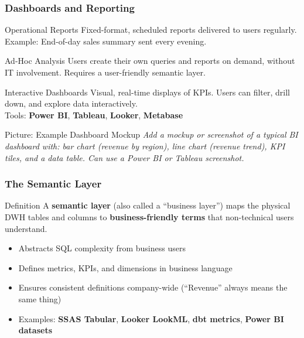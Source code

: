 \begin{frame}
  \frametitle{Dashboards and Reporting}

  \begin{block}{Operational Reports}
    Fixed-format, scheduled reports delivered to users regularly.\\
    Example: End-of-day sales summary sent every evening.
  \end{block}

  \begin{block}{Ad-Hoc Analysis}
    Users create their own queries and reports on demand, without
    IT involvement. Requires a user-friendly semantic layer.
  \end{block}

  \begin{block}{Interactive Dashboards}
    Visual, real-time displays of KPIs. Users can filter, drill down,
    and explore data interactively.\\
    Tools: \textbf{Power BI}, \textbf{Tableau}, \textbf{Looker}, \textbf{Metabase}
  \end{block}

  \begin{alertblock}{Picture: Example Dashboard Mockup}
    \textit{Add a mockup or screenshot of a typical BI dashboard with:
    bar chart (revenue by region), line chart (revenue trend), KPI tiles,
    and a data table. Can use a Power BI or Tableau screenshot.}
  \end{alertblock}

\end{frame}

\begin{frame}
  \frametitle{The Semantic Layer}

  \begin{block}{Definition}
    A \textbf{semantic layer} (also called a ``business layer'') maps the
    physical DWH tables and columns to \textbf{business-friendly terms}
    that non-technical users understand.
  \end{block}

  \begin{itemize}
    \item Abstracts SQL complexity from business users
    \item Defines metrics, KPIs, and dimensions in business language
    \item Ensures consistent definitions company-wide
      (``Revenue'' always means the same thing)
    \item Examples: \textbf{SSAS Tabular}, \textbf{Looker LookML},
      \textbf{dbt metrics}, \textbf{Power BI datasets}
  \end{itemize}

\end{frame}

